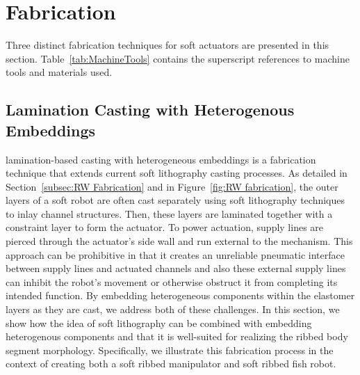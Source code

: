 \section{Fabrication}
\label{sec:Fabrication}
Three distinct fabrication techniques for soft actuators are presented in this section.
Table~\ref{tab:MachineTools} contains the superscript references to machine tools and materials used.

	
\subsection{Lamination Casting with Heterogenous Embeddings}
\label{subsec:Fabrication, Lamination Casting with Heterogenous Embeddings}
lamination-based casting with heterogeneous embeddings is a fabrication technique that extends current soft lithography casting processes.
%
As detailed in Section~\ref{subsec:RW Fabrication} and in Figure~\ref{fig:RW fabrication}, the outer layers of a soft robot are often cast separately using soft lithography techniques to inlay channel structures. Then, these layers are laminated together with a constraint layer to form the actuator.
%
To power actuation, supply lines are pierced through the actuator's side wall and run external to the mechanism.
%
This approach can be prohibitive in that it creates an unreliable pneumatic interface between supply lines and actuated channels and also these external supply lines can inhibit the robot's movement or otherwise obstruct it from completing its intended function.
%
By embedding heterogeneous components within the elastomer layers as they are cast, we address both of these challenges.
%
In this section, we show how the idea of soft lithography can be combined with embedding heterogenous components and that it is well-suited for realizing the ribbed body segment morphology.
%
Specifically, we illustrate this fabrication process in the context of creating both a soft ribbed manipulator and soft ribbed fish robot.


